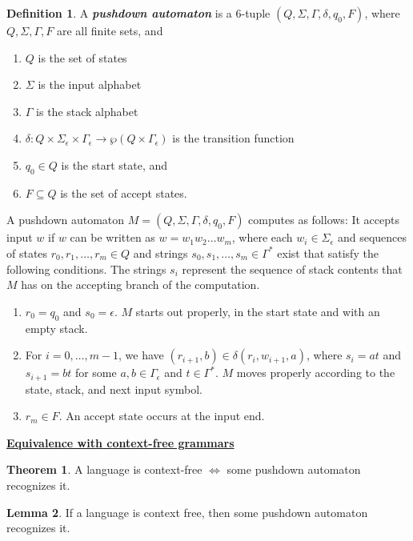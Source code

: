 \documentclass[11pt]{article}
\theoremstyle{definition}
\newtheorem{defn}{Definition}[section]
\newtheorem{thm}{Theorem}[section]
\newtheorem{lemma}[thm]{Lemma}
\begin{document}
\begin{defn}
A \textbf{\textit{pushdown automaton}} is a 6-tuple $(Q,\Sigma, \Gamma, \delta, q_0, F)$, where $Q,\Sigma, \Gamma,  F$ are all finite sets, and
\begin{enumerate}
    \item $Q$ is the set of states
    \item $\Sigma$ is the input alphabet
    \item $\Gamma$ is the stack alphabet
    \item $\delta:Q\times\Sigma_\epsilon\times \Gamma_\epsilon\to \wp(Q\times\Gamma_\epsilon)$ is the transition function
    \item $q_0\in Q$ is the start state, and 
    \item $F\subseteq Q$ is the set of accept states.
\end{enumerate}
A pushdown automaton $M = (Q,\Sigma, \Gamma, \delta, q_0, F)$ computes as follows: It accepts input $w$ if $w$ can be written as $w=w_1w_2\ldots w_m$, where each $w_i\in \Sigma_\epsilon$ and sequences of states $r_0,r_1,\ldots, r_m\in Q$ and strings $s_0,s_1,\ldots,s_m\in \Gamma^*$ exist that satisfy the following conditions. The strings $s_i$ represent the sequence of stack contents that $M$ has on the accepting branch of the computation.
\begin{enumerate}
    \item $r_0 = q_0$ and $s_0 = \epsilon$. $M$ starts out properly, in the start state and with an empty stack.
    \item For $i=0,\ldots, m-1$, we have $(r_{i+1}, b)\in \delta(r_i, w_{i+1}, a)$, where $s_i = at$ and $s_{i+1} = bt$ for some $a,b\in \Gamma_\epsilon$ and $t\in\Gamma^*$. $M$ moves properly according to the state, stack, and next input symbol.
    \item $r_m\in F$. An accept state occurs at the input end.
\end{enumerate}
\end{defn}
\textbf{\underline{Equivalence with context-free grammars}}
\begin{thm}
    A language is context-free $\iff$ some pushdown automaton recognizes it.
\end{thm}
\begin{lemma}
If a language is context free, then some pushdown automaton recognizes it.
\end{lemma}
\end{document}
